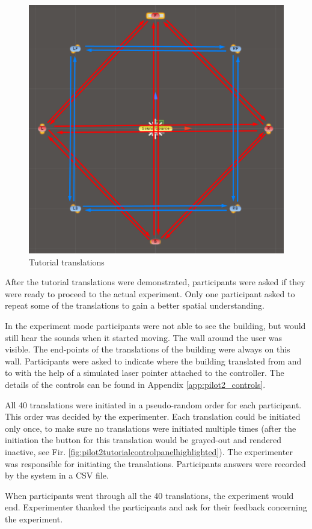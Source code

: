 \begin{figure}
	\centering
	\includegraphics[width=0.7\linewidth]{pilot2_endpoints_tutorial_tranlstaions}
	\caption{Tutorial translations}
	\label{fig:pilot2endpointstutorialtranlstaions}
\end{figure}



After the tutorial translations were demonstrated, participants were asked if they were ready to proceed to the actual experiment. Only one participant asked to repeat some of the translations to gain a better spatial understanding.

In the experiment mode participants were not able to see the building, but would still hear the sounds when it started moving. The wall around the user was visible. The end-points of the translations of the building were always on this wall. Participants were asked to indicate where the building translated from and to with the help of a simulated laser pointer attached to the controller. The details of the controls can be found in Appendix \ref{app:pilot2_controls}.

All 40 translations were initiated in a pseudo-random order for each participant. This order was decided by the experimenter. Each translation could be initiated only once, to make sure no translations were initiated multiple times (after the initiation the button for this translation would be grayed-out and rendered inactive, see Fir. \ref{fig:pilot2tutorialcontrolpanelhighlighted}). The experimenter was responsible for  initiating the translations.
Participants answers were recorded by the system in a CSV file.

When participants went through all the 40 translations, the experiment would end. Experimenter thanked the participants and ask for their feedback concerning the experiment.

